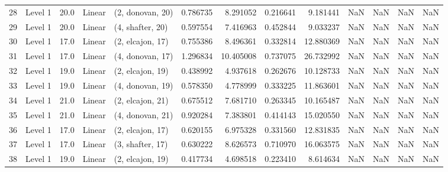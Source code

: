 \begin{tabular}{llrllrrrrrrrr}
28 &   Level 1 &   20.0 &      Linear &  (2, donovan, 20) &   0.786735 &   8.291052 &  0.216641 &   9.181441 &                  NaN &                    NaN &                 NaN &                   NaN \\
29 &   Level 1 &   20.0 &      Linear &  (4, shafter, 20) &   0.597554 &   7.416963 &  0.452844 &   9.033237 &                  NaN &                    NaN &                 NaN &                   NaN \\
30 &   Level 1 &   17.0 &      Linear &  (2, elcajon, 17) &   0.755386 &   8.496361 &  0.332814 &  12.880369 &                  NaN &                    NaN &                 NaN &                   NaN \\
31 &   Level 1 &   17.0 &      Linear &  (4, donovan, 17) &   1.296834 &  10.405008 &  0.737075 &  26.732992 &                  NaN &                    NaN &                 NaN &                   NaN \\
32 &   Level 1 &   19.0 &      Linear &  (2, elcajon, 19) &   0.438992 &   4.937618 &  0.262676 &  10.128733 &                  NaN &                    NaN &                 NaN &                   NaN \\
33 &   Level 1 &   19.0 &      Linear &  (4, donovan, 19) &   0.578350 &   4.778999 &  0.333225 &  11.863601 &                  NaN &                    NaN &                 NaN &                   NaN \\
34 &   Level 1 &   21.0 &      Linear &  (2, elcajon, 21) &   0.675512 &   7.681710 &  0.263345 &  10.165487 &                  NaN &                    NaN &                 NaN &                   NaN \\
35 &   Level 1 &   21.0 &      Linear &  (4, donovan, 21) &   0.920284 &   7.383801 &  0.414143 &  15.020550 &                  NaN &                    NaN &                 NaN &                   NaN \\
36 &   Level 1 &   17.0 &      Linear &  (2, elcajon, 17) &   0.620155 &   6.975328 &  0.331560 &  12.831835 &                  NaN &                    NaN &                 NaN &                   NaN \\
37 &   Level 1 &   17.0 &      Linear &  (3, shafter, 17) &   0.630222 &   8.626573 &  0.710970 &  16.063575 &                  NaN &                    NaN &                 NaN &                   NaN \\
38 &   Level 1 &   19.0 &      Linear &  (2, elcajon, 19) &   0.417734 &   4.698518 &  0.223410 &   8.614634 &                  NaN &                    NaN &                 NaN &                   NaN \\

\end{tabular}
